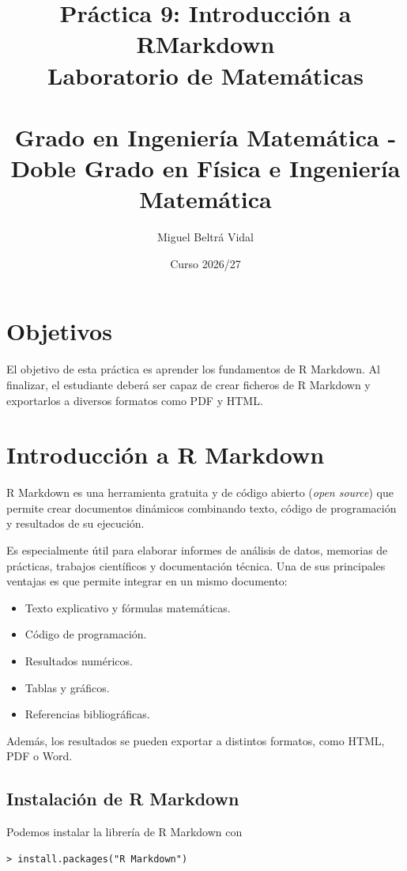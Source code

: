 \documentclass[11pt,a4paper]{article}
\title{\LARGE\textbf{Práctica 9: Introducción a RMarkdown}\\[0.5em]
\Large Laboratorio de Matemáticas\\
\small\ \\
\Large Grado en Ingeniería Matemática - Doble Grado en Física e Ingeniería Matemática}
\author{Miguel Beltrá Vidal}
\date{Curso 2026/27}
\theoremstyle{exercise}
\begin{document}
\maketitle


\section{Objetivos}

El objetivo de esta práctica es aprender los fundamentos de R Markdown. Al finalizar, el estudiante deberá ser capaz de crear ficheros de R Markdown y exportarlos a diversos formatos como PDF y HTML.



\section{Introducción a R Markdown}

R Markdown es una herramienta gratuita y de código abierto (\emph{open source}) que permite crear documentos dinámicos combinando texto, código de programación y resultados de su ejecución.

Es especialmente útil para elaborar informes de análisis de datos, memorias de prácticas, trabajos científicos y documentación técnica. Una de sus principales ventajas es que permite integrar en un mismo documento:

\begin{itemize}
	\item Texto explicativo y fórmulas matemáticas.
	\item Código de programación.
	\item Resultados numéricos.
	\item Tablas y gráficos.
	\item Referencias bibliográficas.
\end{itemize}

Además, los resultados se pueden exportar a distintos formatos, como HTML, PDF o Word.



\subsection{Instalación de R Markdown}

Podemos instalar la librería de R Markdown con

\begin{lstlisting}[style=rconsole]
> install.packages("R Markdown")
\end{lstlisting}
\end{document}
